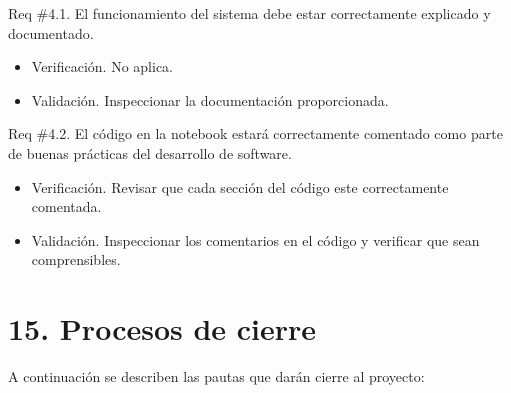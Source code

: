 \documentclass[
11pt, %
]{charter}
\begin{document}
Req \#4.1. El funcionamiento del sistema debe estar correctamente explicado y documentado.

\begin{itemize}
	\item Verificación. No aplica.
	
	\item Validación. Inspeccionar la documentación proporcionada. 
\end{itemize}

Req \#4.2. El código en la notebook estará correctamente comentado como parte de buenas prácticas del desarrollo de software.

\begin{itemize}
	\item Verificación. Revisar que cada sección del código este correctamente comentada.
	
	\item Validación. Inspeccionar los comentarios en el código y verificar que sean comprensibles. 
\end{itemize}

\section{15. Procesos de cierre}    
\label{sec:cierre}

A continuación se describen las pautas que darán cierre al proyecto:
\end{document}
